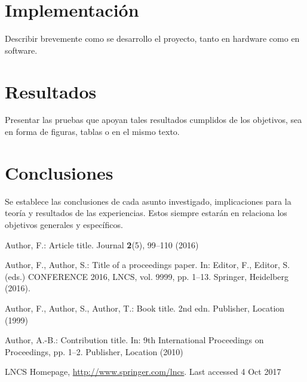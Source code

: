 \documentclass[runningheads]{llncs}
\begin{document}
\section{Implementación}
Describir brevemente como se desarrollo el proyecto, tanto en hardware como en software.
\section{Resultados}
Presentar las pruebas que apoyan tales resultados cumplidos de los objetivos, sea en forma de figuras, tablas o en el mismo texto. 
\section{Conclusiones}
Se establece las conclusiones de cada asunto investigado, implicaciones para la teoría y resultados de las
experiencias. Estos siempre estarán en relaciona los objetivos generales y específicos.

% 
% 

\begin{thebibliography}{8}
Author, F.: Article title. Journal \textbf{2}(5), 99--110 (2016)

Author, F., Author, S.: Title of a proceedings paper. In: Editor,
F., Editor, S. (eds.) CONFERENCE 2016, LNCS, vol. 9999, pp. 1--13.
Springer, Heidelberg (2016). 

Author, F., Author, S., Author, T.: Book title. 2nd edn. Publisher,
Location (1999)

Author, A.-B.: Contribution title. In: 9th International Proceedings
on Proceedings, pp. 1--2. Publisher, Location (2010)

LNCS Homepage, \url{http://www.springer.com/lncs}. Last accessed 4
Oct 2017
\end{thebibliography}
\end{document}
